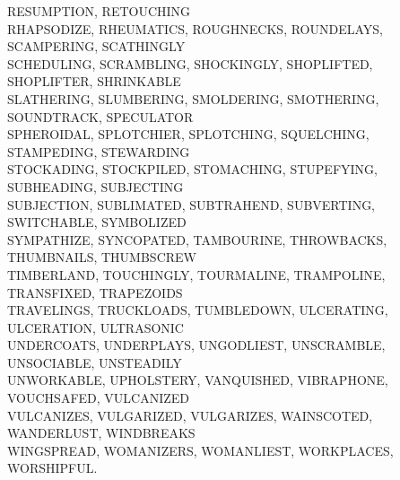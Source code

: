 RESUMPTION, RETOUCHING\\RHAPSODIZE, RHEUMATICS, ROUGHNECKS, ROUNDELAYS, SCAMPERING, SCATHINGLY\\SCHEDULING, SCRAMBLING, SHOCKINGLY, SHOPLIFTED, SHOPLIFTER, SHRINKABLE\\SLATHERING, SLUMBERING, SMOLDERING, SMOTHERING, SOUNDTRACK, SPECULATOR\\SPHEROIDAL, SPLOTCHIER, SPLOTCHING, SQUELCHING, STAMPEDING, STEWARDING\\STOCKADING, STOCKPILED, STOMACHING, STUPEFYING, SUBHEADING, SUBJECTING\\SUBJECTION, SUBLIMATED, SUBTRAHEND, SUBVERTING, SWITCHABLE, SYMBOLIZED\\SYMPATHIZE, SYNCOPATED, TAMBOURINE, THROWBACKS, THUMBNAILS, THUMBSCREW\\TIMBERLAND, TOUCHINGLY, TOURMALINE, TRAMPOLINE, TRANSFIXED, TRAPEZOIDS\\TRAVELINGS, TRUCKLOADS, TUMBLEDOWN, ULCERATING, ULCERATION, ULTRASONIC\\UNDERCOATS, UNDERPLAYS, UNGODLIEST, UNSCRAMBLE, UNSOCIABLE, UNSTEADILY\\UNWORKABLE, UPHOLSTERY, VANQUISHED, VIBRAPHONE, VOUCHSAFED, VULCANIZED\\VULCANIZES, VULGARIZED, VULGARIZES, WAINSCOTED, WANDERLUST, WINDBREAKS\\WINGSPREAD, WOMANIZERS, WOMANLIEST, WORKPLACES, WORSHIPFUL.